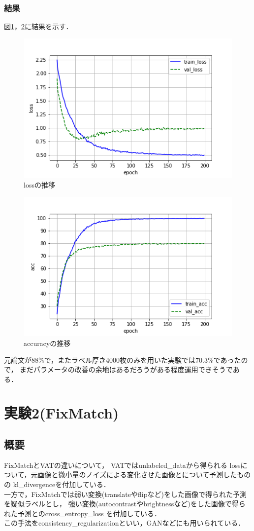 \documentclass[twocolumn]{jarticle}     %
\begin{document}
\subsubsection{結果}
図\ref{fig:loss1}，\ref{fig:acc1}に結果を示す．
\begin{figure}[h]
	\centering
	\includegraphics[scale=0.6]{loss_12.png}
	\caption{lossの推移\label{fig:loss1}}
\end{figure}

\begin{figure}[h]
	\centering
	\includegraphics[scale=0.6]{acc_12.png}
	\caption{accuracyの推移\label{fig:acc1}}
\end{figure}

元論文が88\%で，またラベル厚き4000枚のみを用いた実験では70.3\%であったので，
まだパラメータの改善の余地はあるだろうがある程度運用できそうである．


\section{実験2(FixMatch)}
\subsection{概要}
FixMatchとVATの違いについて，
VATではunlabeled\_dataから得られる
lossについて，元画像と微小量のノイズによる変化させた画像とについて予測したものの
kl\_divergenceを付加している．\\
一方で，FixMatchでは弱い変換(translateやflipなど)をした画像で得られた予測を疑似ラベルとし，
強い変換(autocontrastやbrightnessなど)をした画像で得られた予測とのcross\_entropy\_loss
を付加している．\\
この手法をconsistency\_regularizationといい，GANなどにも用いられている．
\end{document}
